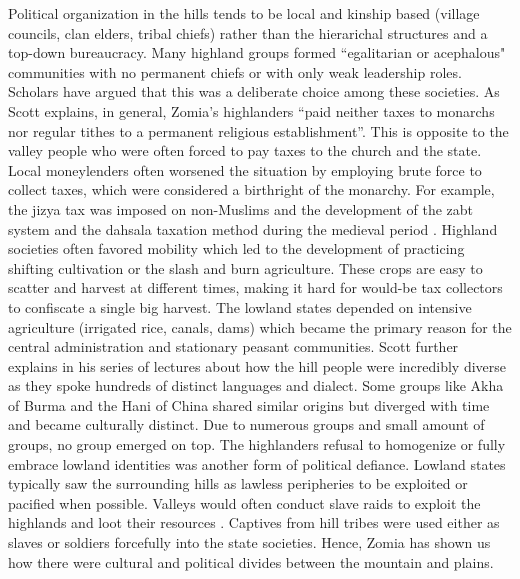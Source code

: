 Political organization in the hills tends to be local and kinship based (village councils, clan elders, tribal chiefs) rather than the hierarichal structures and a top\hyp{}down bureaucracy. Many highland groups formed ``egalitarian or acephalous" communities with no permanent chiefs or with only weak leadership roles. Scholars have argued that this was a deliberate choice among these societies. As Scott explains, in general, Zomia’s highlanders ``paid neither taxes to monarchs nor regular tithes to a permanent religious establishment”. This is opposite to the valley people who were often forced to pay taxes to the church and the state. Local moneylenders often worsened the situation by employing brute force to collect taxes, which were considered a birthright of the monarchy. For example, the jizya tax was imposed on non\hyp{}Muslims and the development of the zabt system and the dahsala taxation method during the medieval period \citep{moosvi1973production}. Highland societies often favored mobility which led to the development of practicing shifting cultivation or the slash and burn agriculture. These crops are easy to scatter and harvest at different times, making it hard for would\hyp{}be tax collectors to confiscate a single big harvest. The lowland states depended on intensive agriculture (irrigated rice, canals, dams) which became the primary reason for the central administration and stationary peasant communities. Scott further explains in his series of lectures  \citep{scott2005civilizations} about how the hill people were incredibly diverse as they spoke hundreds of distinct languages and dialect. Some groups like Akha of Burma and the Hani of China shared similar origins \citep{boonyasaranai2014common} but diverged with time and became culturally distinct. Due to numerous groups and small amount of groups, no group emerged on top. The highlanders refusal to homogenize or fully embrace lowland identities was another form of political defiance. Lowland states typically saw the surrounding hills as lawless peripheries to be exploited or pacified when possible. Valleys would often conduct slave raids to exploit the highlands and loot their resources \citep{walker1999legend}. Captives from hill tribes were used either as slaves or soldiers forcefully into the state societies. Hence, Zomia has shown us how there were cultural and political divides between the mountain and plains.

